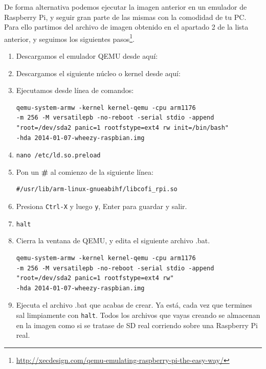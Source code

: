 De forma alternativa podemos ejecutar la imagen anterior en un emulador de
Raspberry Pi, y seguir gran parte de las mismas con la comodidad de tu PC. Para
ello partimos del archivo de imagen obtenido en el apartado 2 de la lista anterior,
y seguimos los siguientes pasos\footnote{\url{http://xecdesign.com/qemu-emulating-raspberry-pi-the-easy-way/}}.

\begin{enumerate}
  \item Descargamos el emulador QEMU desde aquí: \newline
\hspace{2.5cm}{\bf http://lassauge.free.fr/qemu/}
  \item Descargamos el siguiente núcleo o kernel desde aquí: \newline
\hspace{2.5cm}{\bf http://xecdesign.com/downloads/linux-qemu/kernel-qemu}
  \item Ejecutamos desde línea de comandos:
\begin{lstlisting}
qemu-system-armw -kernel kernel-qemu -cpu arm1176
-m 256 -M versatilepb -no-reboot -serial stdio -append
"root=/dev/sda2 panic=1 rootfstype=ext4 rw init=/bin/bash"
-hda 2014-01-07-wheezy-raspbian.img
\end{lstlisting}
  \item {\tt nano /etc/ld.so.preload}
  \item Pon un {\bf \#} al comienzo de la siguiente línea:
\begin{lstlisting}
#/usr/lib/arm-linux-gnueabihf/libcofi_rpi.so
\end{lstlisting}
  \item Presiona {\tt Ctrl-X} y luego {\tt y}, Enter para guardar y salir.
  \item {\tt halt}
  \item Cierra la ventana de QEMU, y edita el siguiente archivo .bat.
\begin{lstlisting}
qemu-system-armw -kernel kernel-qemu -cpu arm1176
-m 256 -M versatilepb -no-reboot -serial stdio -append
"root=/dev/sda2 panic=1 rootfstype=ext4 rw"
-hda 2014-01-07-wheezy-raspbian.img
\end{lstlisting}
  \item Ejecuta el archivo .bat que acabas de crear. Ya está, cada vez que
termines sal limpiamente con {\tt halt}. Todos los archivos que vayas creando
se almacenan en la imagen como si se tratase de SD real corriendo sobre una
Raspberry Pi real.
\end{enumerate}

